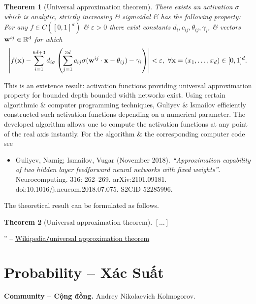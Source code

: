 \documentclass{article}
\newtheorem{theorem}{Theorem}
\begin{document}
\begin{theorem}[Universal approximation theorem]
	There exists an activation $\sigma$ which is analytic, strictly increasing \& sigmoidal \& has the following property: For any $f\in C([0,1]^d)$ \& $\varepsilon > 0$ there exist constants $d_i,c_{ij},\theta_{ij},\gamma_i$, \& vectors ${\bf w}^{ij}\in\mathbb{R}^d$ for which
	\begin{equation*}
		\left|f({\bf x}) - \sum_{i=1}^{6d + 3} d_{i\sigma}\left(\sum_{j=1}^{3d} c_{ij}\sigma({\bf w}^{ij}\cdot{\bf x} - \theta_{ij}) - \gamma_i\right)\right| < \varepsilon,\ \forall{\bf x} = (x_1,\ldots,x_d)\in[0,1]^d.
	\end{equation*}
\end{theorem}
This is an existence result: activation functions providing universal approximation property for bounded depth bounded width networks exist. Using certain algorithmic \& computer programming techniques, Guliyev \& Ismailov efficiently constructed such activation functions depending on a numerical parameter. The developed algorithm allows one to compute the activation functions at any point of the real axis instantly. For the algorithm \& the corresponding computer code see
\begin{itemize}
	\item {\sc Guliyev, Namig; Ismailov, Vugar} (November 2018). {\it``Approximation capability of two hidden layer feedforward neural networks with fixed weights''}. Neurocomputing. 316: 262--269. arXiv:2101.09181. doi:10.1016/j.neucom.2018.07.075. S2CID 52285996.
\end{itemize}
The theoretical result can be formulated as follows.

\begin{theorem}[Universal approximation theorem]
	$[\ldots]$
\end{theorem}
'' -- \href{https://en.wikipedia.org/wiki/Universal_approximation_theorem}{Wikipedia{\tt/}universal approximation theorem}


\section{Probability -- Xác Suất}
\textbf{\textsf{Community -- Cộng đồng.}} {\sc Andrey Nikolaevich Kolmogorov}.
\end{document}
